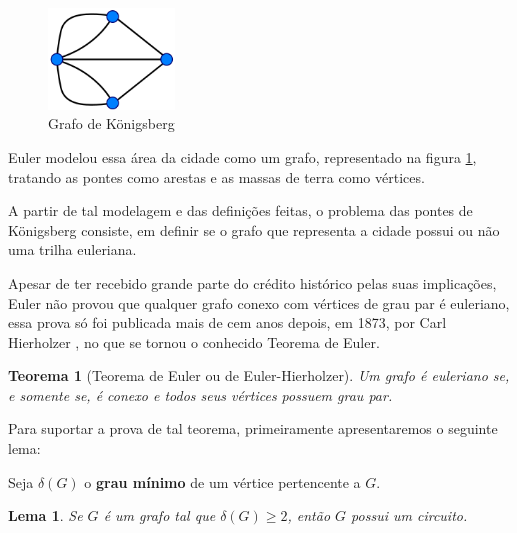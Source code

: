 \documentclass[12pt, a4paper]{article}
\newtheorem{theorem}{Teorema}[section]
\newtheorem{lemma}{Lema}
\begin{document}
\begin{figure}
    \centering
    \includegraphics[width=0.3\textwidth]{konigsberg-graph.png}
    \caption{Grafo de Königsberg}
    \label{konigsberg-graph}
\end{figure}

Euler modelou essa área da cidade como um grafo, representado na figura \ref{konigsberg-graph}, tratando as pontes como arestas e as massas de terra como vértices.

A partir de tal modelagem e das definições feitas, o problema das pontes de Königsberg consiste, em definir se o grafo que representa a cidade possui ou não uma trilha euleriana. 

Apesar de ter recebido grande parte do crédito histórico pelas suas implicações, Euler não provou que qualquer grafo conexo com vértices de grau par é euleriano, essa prova só foi publicada mais de cem anos depois, em 1873, por Carl Hierholzer \cite{hierholzer}, no que se tornou o conhecido Teorema de Euler.


\begin{theorem}[Teorema de Euler ou de Euler-Hierholzer]
    Um grafo é euleriano se, e somente se, é conexo e todos seus vértices possuem grau par.
    \label{euler}
\end{theorem}

Para suportar a prova de tal teorema, primeiramente apresentaremos o seguinte lema:

Seja $\delta(G)$ o \textbf{grau mínimo} de um vértice pertencente a $G$.

\begin{lemma}
	Se $G$ é um grafo tal que $\delta(G) \geq 2$, então $G$ possui um circuito.
	\label{lema}
\end{lemma}
\end{document}
